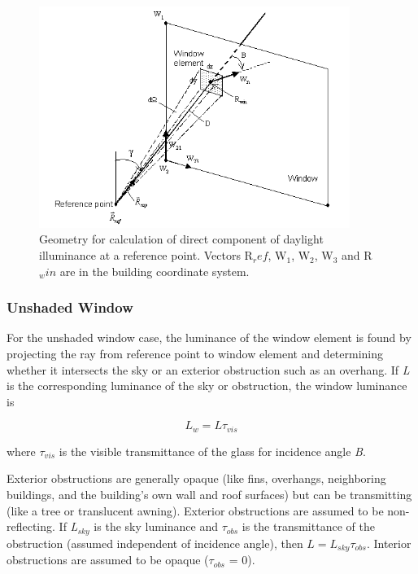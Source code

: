 \begin{figure}[hbtp] %
\centering
\includegraphics[width=0.9\textwidth, height=0.9\textheight, keepaspectratio=true]{media/image755.png}
\caption{Geometry for calculation of direct component of daylight illuminance at a reference point. Vectors R\(_ref\), W\(_1\), W\(_2\), W\(_3\) and R\(_win\) are in the building coordinate system. \protect \label{fig:geometry-for-calculation-of-direct-component}}
\end{figure}

\subsubsection{Unshaded Window}\label{unshaded-window}

For the unshaded window case, the luminance of the window element is found by projecting the ray from reference point to window element and determining whether it intersects the sky or an exterior obstruction such as an overhang. If \emph{L} is the corresponding luminance of the sky or obstruction, the window luminance is

\begin{equation}
{L_w} = L{\tau_{vis}}
\end{equation}

where \({\tau_{vis}}\) is the visible transmittance of the glass for incidence angle \emph{B}.

Exterior obstructions are generally opaque (like fins, overhangs, neighboring buildings, and the building's own wall and roof surfaces) but can be transmitting (like a tree or translucent awning). Exterior obstructions are assumed to be non-reflecting. If \emph{L\(_{sky}\)} is the sky luminance and \emph{$\tau$\(_{obs}\)} is the transmittance of the obstruction (assumed independent of incidence angle), then \(L = L_{sky} \tau_{obs}\). Interior obstructions are assumed to be opaque ($\tau$\(_{obs}\) = 0).

